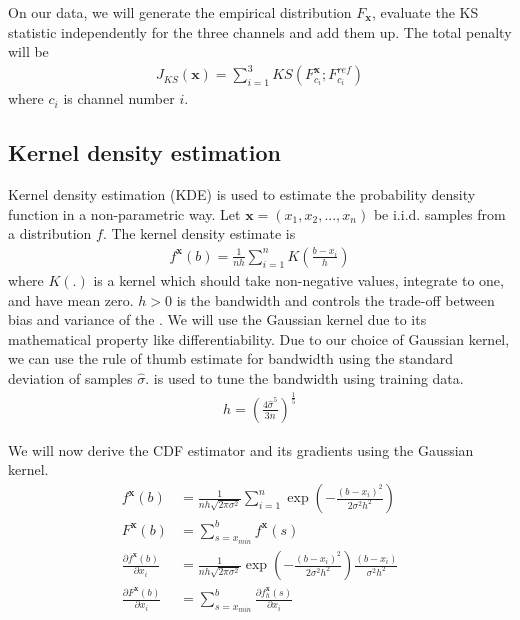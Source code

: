 On our data, we will generate the empirical distribution $F_\mathbf{x}$, evaluate the KS statistic independently for the three channels and add them up. The total penalty will be
\begin{align}
    J_{KS}(\mathbf{x}) = \sum_{i=1}^{3} KS(F^{\mathbf{x}}_{c_i}; F^{ref}_{c_i}) \label{eqn:cost_ks}
\end{align}
where $c_i$ is channel number $i$.

\subsection{Kernel density estimation}
Kernel density estimation (KDE) is used to estimate the probability density function in a non-parametric way. Let $ \mathbf{x} = \left( x_1, x_2, ..., x_n\right)$ be i.i.d. samples from a distribution $f$. The kernel density estimate is
\begin{align}
    f^\mathbf{x} (b) = \frac{1}{nh} \sum_{i=1}^{n} K\left(\frac{b-x_i}{h}\right) \label{eqn:kde}
\end{align}
where $K(.)$ is a kernel which should take non-negative values, integrate to one, and have mean zero. $h > 0$ is the bandwidth and controls the trade-off between bias and variance of the . We will use the Gaussian kernel due to its mathematical property like differentiability. Due to our choice of Gaussian kernel, we can use the rule of thumb estimate \cite{silverman1986density} for bandwidth using the standard deviation of samples $\hat{\sigma}$.  is used to tune the bandwidth using training data.
\begin{align}
    h = \left( \frac{4 \hat{\sigma}^5}{3n}\right)^{\frac{1}{5}} \label{eqn:kdebw}
\end{align}

We will now derive the CDF estimator and its gradients using the Gaussian kernel.
\begin{align}
    f^\mathbf{x} (b) &= \frac{1}{nh \sqrt{2 \pi \sigma^2}} \sum_{i=1}^{n} \exp \left( -\frac{(b-x_i)^2} {2 \sigma^2 h^2}\right) \\
    F^\mathbf{x} (b) &= \sum_{s=x_{min}}^{b} f^\mathbf{x} (s) \label{eqn:kdecdf} \\
    \frac{\partial f^\mathbf{x} (b)}{\partial x_i} &=  \frac{1}{nh \sqrt{2 \pi \sigma^2}} \exp \left( -\frac{(b-x_i)^2} {2 \sigma^2 h^2}\right) \frac{ \left( b - x_i \right) }{ \sigma^2 h^2} \\
    \frac{\partial F^\mathbf{x} (b)} {\partial x_i} &= \sum_{s=x_{min}}^{b} \frac{\partial f^\mathbf{x}_h (s)}{\partial x_i}
\end{align}

